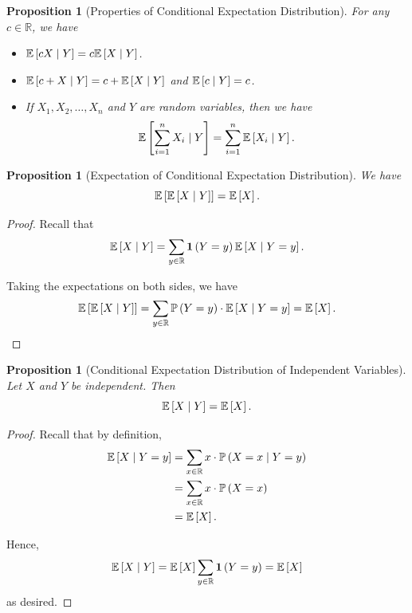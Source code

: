 \documentclass{article}
\newtheorem{proposition}[theorem]{Proposition}
\theoremstyle{definition}
\theoremstyle{remark}
\newcommand{\RR}{\mathbb{R}}
\newcommand{\Prob}{\mathbb{P}}
\newcommand{\Expt}{\mathbb{E}}
\newcommand{\Conditional}[2]{#1\mid #2}
\newcommand{\indicator}{\mathbf{1}}
\begin{document}
\begin{proposition}[Properties of Conditional Expectation Distribution]
    \label{prop:conditional-expectation-distribution-property}%
    For any \(c \in \RR\), we have
    \begin{itemize}
        \item \(\Expt\bqty{\Conditional{cX}{Y}} = c \Expt\bqty{\Conditional{X}{Y}}\).
        \item \(\Expt\bqty{\Conditional{c + X}{Y}} = c + \Expt\bqty{\Conditional{X}{Y}}\) and \(\Expt\bqty{\Conditional{c}{Y}} = c\).
        \item If \(X_1, X_2, \ldots, X_n\) and \(Y\) are random variables, then we have
        \[
            \Expt\bqty{\Conditional{\sum_{i = 1}^{n} X_i}{Y}} = \sum_{i = 1}^{n} \Expt\bqty{\Conditional{X_i}{Y}}.
        \]
    \end{itemize}
\end{proposition}

\begin{proposition}[Expectation of Conditional Expectation Distribution]
    \label{prop:expectation-conditional-expectation-distribution}%
    We have
    \[
        \Expt\bqty{\Expt\bqty{\Conditional{X}{Y}}} = \Expt\bqty{X}.
    \]
\end{proposition}

\begin{proof}
    Recall that
    \[
        \Expt\bqty{\Conditional{X}{Y}} = \sum_{y \in \RR} \indicator\pqty{Y = y} \Expt\bqty{\Conditional{X}{Y = y}}.
    \]

    Taking the expectations on both sides, we have
    \[
        \Expt\bqty{\Expt\bqty{\Conditional{X}{Y}}} = \sum_{y \in \RR} \Prob\pqty{Y = y} \cdot \Expt\bqty{\Conditional{X}{Y = y}} = \Expt\bqty{X}.
    \]
\end{proof}

\begin{proposition}[Conditional Expectation Distribution of Independent Variables]
    \label{prop:conditional-expectation-distribution-independent}%
    Let \(X\) and \(Y\) be independent. Then
    \[
        \Expt\bqty{\Conditional{X}{Y}} = \Expt\bqty{X}.
    \]
\end{proposition}

\begin{proof}
    Recall that by definition,
    \begin{align*}
        \Expt\bqty{\Conditional{X}{Y = y}} &= \sum_{x \in \RR} x \cdot \Prob\pqty{\Conditional{X = x}{Y = y}} \\
        &= \sum_{x \in \RR} x \cdot \Prob\pqty{X = x} \\
        &= \Expt\bqty{X}.
    \end{align*}

    Hence,
    \[
        \Expt\bqty{\Conditional{X}{Y}} = \Expt\bqty{X} \sum_{y \in \RR} \indicator\pqty{Y = y} = \Expt\bqty{X}
    \]
    as desired.
\end{proof}
\end{document}
